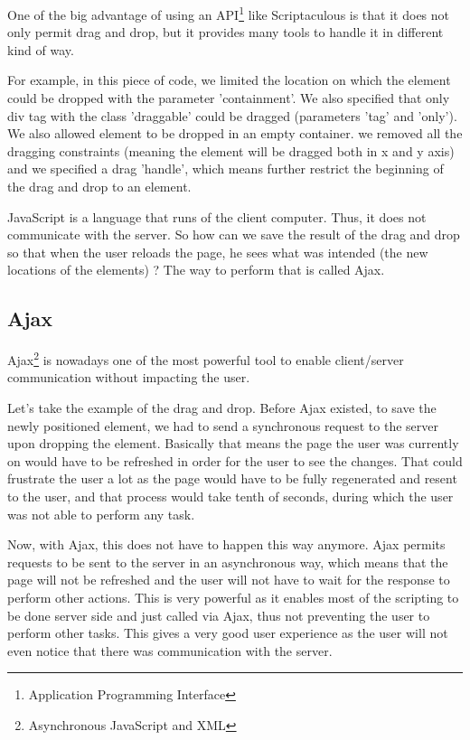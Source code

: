 One of the big advantage of using an API\footnote{Application Programming Interface} like Scriptaculous is that it does not only permit drag and drop, but it provides many tools to handle it in different kind of way. 

For example, in this piece of code, we limited the location on which the element could be dropped with the parameter 'containment'. We also specified that only div tag with the class 'draggable' could be dragged (parameters 'tag' and 'only'). We also allowed element to be dropped in an empty container. we removed all the dragging constraints (meaning the element will be dragged both in x and y axis) and we specified a drag 'handle', which means further restrict the beginning of the drag and drop to an element.

JavaScript is a language that runs of the client computer. Thus, it does not communicate with the server. So how can we save the result of the drag and drop so that when the user reloads the page, he sees what was intended (the new locations of the elements) ? The way to perform that is called Ajax.

\subsection{Ajax}

Ajax\footnote{Asynchronous JavaScript and XML} is nowadays one of the most powerful tool to enable client/server communication without impacting the user. 

Let's take the example of the drag and drop. Before Ajax existed, to save the newly positioned element, we had to send a synchronous request to the server upon dropping the element. Basically that means the page the user was currently on would have to be refreshed in order for the user to see the changes. That could frustrate the user a lot as the page would have to be fully regenerated and resent to the user, and that process would take tenth of seconds, during which the user was not able to perform any task. 

Now, with Ajax, this does not have to happen this way anymore. Ajax permits requests to be sent to the server in an asynchronous way, which means that the page will not be refreshed and the user will not have to wait for the response to perform other actions. This is very powerful as it enables most of the scripting to be done server side and just called via Ajax, thus not preventing the user to perform other tasks. This gives a very good user experience as the user will not even notice that there was communication with the server.

